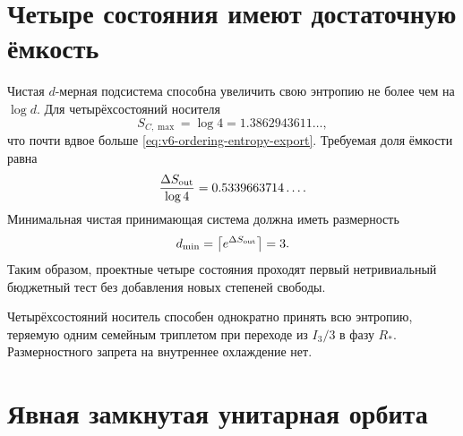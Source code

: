 \section{Четыре состояния имеют достаточную ёмкость}

Чистая $d$-мерная подсистема способна увеличить свою энтропию не более чем
на $\log d$. Для четырёхсостояний носителя
\begin{equation}
 S_{C,\max}=\log4=1.3862943611\ldots,
\end{equation}
что почти вдвое больше \eqref{eq:v6-ordering-entropy-export}. Требуемая
доля ёмкости равна
\begin{equation}
 \frac{\Delta S_{\rm out}}{\log4}=0.5339663714\ldots.
\end{equation}
Минимальная чистая принимающая система должна иметь размерность
\begin{equation}
 d_{\min}=\left\lceil e^{\Delta S_{\rm out}}\right\rceil=3.
\end{equation}
Таким образом, проектные четыре состояния проходят первый нетривиальный
бюджетный тест без добавления новых степеней свободы.

\begin{proposition}
Четырёхсостояний носитель способен однократно принять всю энтропию,
теряемую одним семейным триплетом при переходе из $I_3/3$ в фазу
$R_*$. Размерностного запрета на внутреннее охлаждение нет.
\end{proposition}

\section{Явная замкнутая унитарная орбита}

